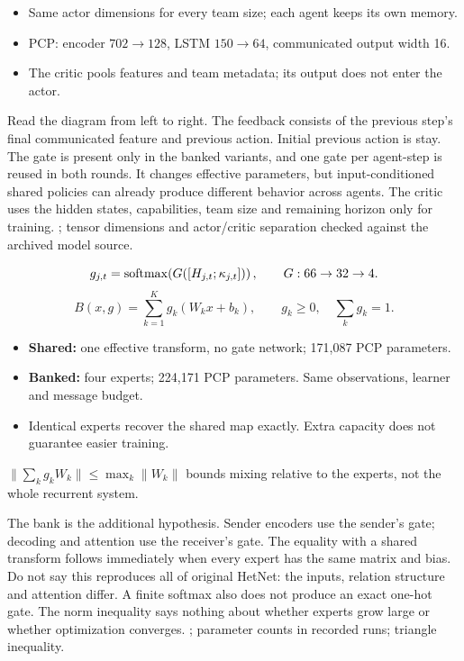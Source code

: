 {\architecture\small
\begin{itemize}
\item Same actor dimensions for every team size; each agent keeps its own memory.
\item PCP: encoder $702\to128$, LSTM $150\to64$, communicated output width 16.
\item The critic pools features and team metadata; its output does not enter the actor.
\end{itemize}}
{Read the diagram from left to right. The feedback consists of the previous step's final communicated feature and previous action. Initial previous action is stay. The gate is present only in the banked variants, and one gate per agent-step is reused in both rounds. It changes effective parameters, but input-conditioned shared policies can already produce different behavior across agents. The critic uses the hidden states, capabilities, team size and remaining horizon only for training.}
{; tensor dimensions and actor/critic separation checked against the archived model source.}

{\[
g_{j,t}=\operatorname{softmax}\!\left(G([H_{j,t};\kappa_{j,t}])\right),\qquad G:66\to32\to4.
\]
\[
B(x,g)=\sum_{k=1}^{K}g_k(W_kx+b_k),\qquad g_k\ge0,\quad\sum_k g_k=1.
\]
\begin{itemize}
\item \textbf{Shared:} one effective transform, no gate network; 171,087 PCP parameters.
\item \textbf{Banked:} four experts; 224,171 PCP parameters. Same observations, learner and message budget.
\item Identical experts recover the shared map exactly. Extra capacity does not guarantee easier training.
\end{itemize}
\small $\|\sum_k g_kW_k\|\le\max_k\|W_k\|$ bounds mixing relative to the experts, not the whole recurrent system.}
{The bank is the additional hypothesis. Sender encoders use the sender's gate; decoding and attention use the receiver's gate. The equality with a shared transform follows immediately when every expert has the same matrix and bias. Do not say this reproduces all of original HetNet: the inputs, relation structure and attention differ. A finite softmax also does not produce an exact one-hot gate. The norm inequality says nothing about whether experts grow large or whether optimization converges.}
{; parameter counts in recorded runs; triangle inequality.}

